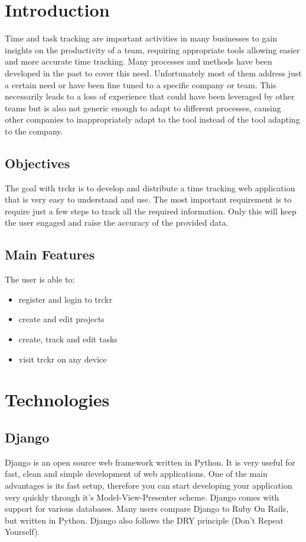 \documentclass[a4paper, 12pt, headsepline]{scrartcl}
\begin{document}
\section{Introduction}
Time and task tracking are important activities in many businesses to gain
insights on the productivity of a team, requiring appropriate tools allowing
easier and more accurate time tracking. Many processes and methods have been
developed in the past to cover this need. Unfortunately most of them address
just a certain need or have been fine tuned to a specific company or team. This
necessarily leads to a loss of experience that could have been leveraged by
other teams but is also not generic enough to adapt to different processes,
causing other companies to inappropriately adapt to the tool instead of the tool
adapting to the company.

\subsection{Objectives}
The goal with trckr is to develop and distribute a time tracking web application
that is very easy to understand and use. The most important requirement is to
require just a few steps to track all the required information. Only this will
keep the user engaged and raise the accuracy of the provided data.

\subsection{Main Features}
The user is able to:
\begin{itemize}
    \item register and login to trckr
    \item create and edit projects
    \item create, track and edit tasks
    \item visit trckr on any device
\end{itemize}

\section{Technologies}
\subsection{Django}
Django is an open source web framework written in Python. It is very useful for
fast, clean and simple development of web applications. One of the main
advantages is its fast setup, therefore you can start developing your
application very quickly through it's Model-View-Presenter scheme. Django comes
with support for various databases. Many users compare Django to Ruby On Rails,
but written in Python. Django also follows the DRY principle (Don't Repeat
Yourself).
\end{document}
